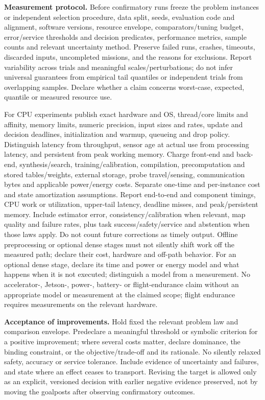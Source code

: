 \documentclass[11pt,letterpaper]{article}
\begin{document}
\textbf{Measurement protocol.} Before confirmatory runs freeze the problem instances or independent selection procedure, data split, seeds, evaluation code and alignment, software versions, resource envelope, comparators/tuning budget, error/service thresholds and decision predicates, performance metrics, sample counts and relevant uncertainty method. Preserve failed runs, crashes, timeouts, discarded inputs, uncompleted missions, and the reasons for exclusions. Report variability across trials and meaningful scales/perturbations; do not infer universal guarantees from empirical tail quantiles or independent trials from overlapping samples. Declare whether a claim concerns worst-case, expected, quantile or measured resource use.

For CPU experiments publish exact hardware and OS, thread/core limits and affinity, memory limits, numeric precision, input sizes and rates, update and decision deadlines, initialization and warmup, queueing and drop policy. Distinguish latency from throughput, sensor age at actual use from processing latency, and persistent from peak working memory. Charge front-end and back-end, synthesis/search, training/calibration, compilation, precomputation and stored tables/weights, external storage, probe travel/sensing, communication bytes and applicable power/energy costs. Separate one-time and per-instance cost and state amortization assumptions. Report end-to-end and component timings, CPU work or utilization, upper-tail latency, deadline misses, and peak/persistent memory. Include estimator error, consistency/calibration when relevant, map quality and failure rates, plus task success/safety/service and abstention when those laws apply. Do not count future corrections as timely output. Offline preprocessing or optional dense stages must not silently shift work off the measured path; declare their cost, hardware and off-path behavior. For an optional dense stage, declare its time and power or energy model and what happens when it is not executed; distinguish a model from a measurement. No accelerator-, Jetson-, power-, battery- or flight-endurance claim without an appropriate model or measurement at the claimed scope; flight endurance requires measurements on the relevant hardware.

\textbf{Acceptance of improvements.} Hold fixed the relevant problem law and comparison envelope. Predeclare a meaningful threshold or symbolic criterion for a positive improvement; where several costs matter, declare dominance, the binding constraint, or the objective/trade-off and its rationale. No silently relaxed safety, accuracy or service tolerance. Include evidence of uncertainty and failures, and state where an effect ceases to transport. Revising the target is allowed only as an explicit, versioned decision with earlier negative evidence preserved, not by moving the goalposts after observing confirmatory outcomes.
\end{document}
